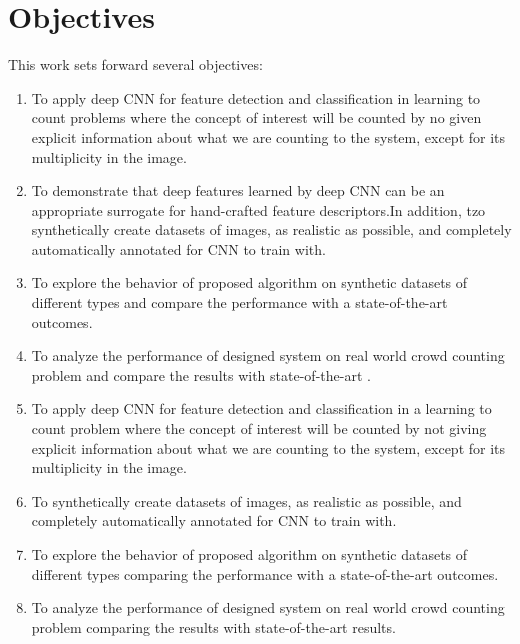 \section{Objectives}
This work sets forward several objectives:
\begin{enumerate}

\item To apply deep CNN for feature detection and classification in learning to count problems where the concept of interest will be counted by no given explicit information about what we are counting to the system, except for its multiplicity in the image.
\item To demonstrate that deep features learned by deep CNN can be an appropriate surrogate for hand-crafted feature descriptors.In addition, tzo synthetically create datasets of images, as realistic as possible, and completely automatically annotated for CNN to train with.
\item To explore the behavior of proposed algorithm on synthetic datasets of different types and compare the performance with a state-of-the-art outcomes\cite{segui2015learning}.   
\item To analyze the performance of designed system on real world crowd counting problem and compare the results with state-of-the-art \cite{chan2008privacy}.   

\item To apply deep CNN for feature detection and classification in a learning to count problem where the concept of interest will be counted by not giving explicit information about what we are counting to the system, except for its multiplicity in the image. 
\item To synthetically create datasets of images, as realistic as possible, and completely automatically annotated for CNN to train with.
\item To explore the behavior of proposed algorithm on synthetic datasets of different types comparing the performance with a state-of-the-art outcomes\cite{segui2015learning}.   
\item To analyze the performance of designed system on real world crowd counting problem comparing the results with state-of-the-art results\cite{chan2008privacy}.   


\end{enumerate}
